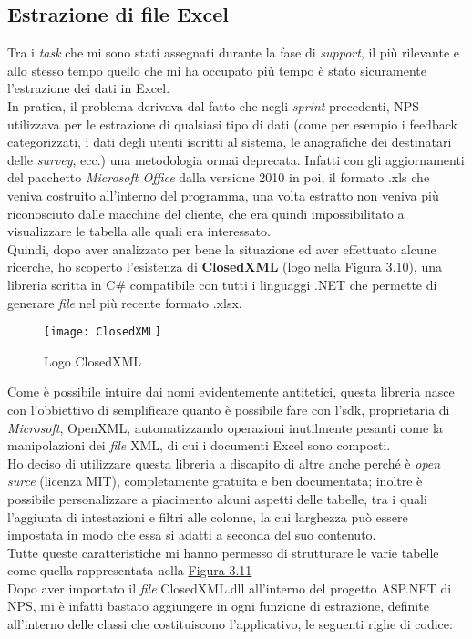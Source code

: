 \subsection{Estrazione di file Excel}
Tra i \textit{task} che mi sono stati assegnati durante la fase di \textit{support}, il più rilevante e allo stesso tempo quello che mi ha occupato più tempo è stato sicuramente l'estrazione dei dati in Excel. \\
In pratica, il problema derivava dal fatto che negli \textit{sprint} precedenti, NPS utilizzava per le estrazione di qualsiasi tipo di dati (come per esempio i feedback categorizzati, i dati degli utenti iscritti al sistema, le anagrafiche dei destinatari delle \textit{survey}, ecc.) una metodologia ormai deprecata. Infatti con gli aggiornamenti del pacchetto \textit{Microsoft Office} dalla versione 2010 in poi, il formato .xls che veniva costruito all'interno del programma, una volta estratto non veniva più riconosciuto dalle macchine del cliente, che era quindi impossibilitato a visualizzare le tabella alle quali era interessato. \\ Quindi, dopo aver analizzato per bene la situazione ed aver effettuato alcune ricerche, ho scoperto l'esistenza di \textbf{ClosedXML} (logo nella \hyperref[closedXML]{Figura 3.10}), una libreria scritta in C\# compatibile con tutti i linguaggi .NET che permette di generare \textit{file} nel più recente formato .xlsx. 

\begin{figure}[ht]
\begin{center}
\texttt{[image: ClosedXML]}
\caption{Logo ClosedXML}
\label{closedXML}
\end{center}
\end{figure}

Come è possibile intuire dai nomi evidentemente antitetici, questa libreria nasce con l'obbiettivo di semplificare quanto è possibile fare con l'\acrshort{sdk}, proprietaria di \textit{Microsoft}, OpenXML, automatizzando operazioni inutilmente pesanti come la manipolazioni dei \textit{file} XML, di cui i documenti Excel sono composti. \\
Ho deciso di utilizzare questa libreria a discapito di altre anche perché è \textit{open surce} (licenza MIT), completamente gratuita e ben documentata; inoltre è possibile personalizzare a piacimento alcuni aspetti delle tabelle, tra i quali l'aggiunta di intestazioni e filtri alle colonne, la cui larghezza può essere impostata in modo che essa si adatti a seconda del suo contenuto. \\
Tutte queste caratteristiche mi hanno permesso di strutturare le varie tabelle come quella rappresentata nella \hyperref[tabella]{Figura 3.11} \\
Dopo aver importato il \textit{file} ClosedXML.dll all'interno del progetto ASP.NET di NPS, mi è infatti bastato aggiungere in ogni funzione di estrazione, definite all'interno delle classi che costituiscono l'applicativo, le seguenti righe di codice:

